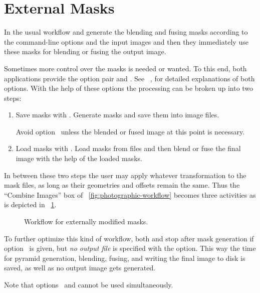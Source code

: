 

\section[External Masks]{\label{sec:external-masks}%
  External Masks}

In the usual workflow  and  generate the blending and
fusing masks according to the command-line options and the input images and then they
immediately use these masks for blending or fusing the output image.

Sometimes more control over the masks is needed or wanted.  To this end, both applications
provide the option pair  and .  See
\chapterName~, for detailed explanations of both options.  With the help
of these options the processing can be broken up into two steps:

\begin{enumerate}
\item
  Save masks with .  Generate masks and save them into image files.

  Avoid option~ unless the blended or fused image at this point is necessary.

\item
  Load masks with .  Load masks from files and then blend or fuse the final
  image with the help of the loaded masks.
\end{enumerate}

In between these two steps the user may apply whatever transformation to the mask files, as long
as their geometries and offsets remain the same.  Thus the ``Combine Images'' box of
\figureName~\ref{fig:photographic-workflow} becomes three activities as is depicted in
\figureName~\ref{fig:external-mask-workflow}.

\begin{figure}
  \begin{maxipage}
    \centering
  \end{maxipage}

  \caption[External mask workflow]{\label{fig:external-mask-workflow}%
    Workflow for externally modified masks.}
\end{figure}

To further optimize this kind of workflow, both  and 
stop after mask generation if option~ is given, but \emph{no output file}
is specified with the  option.  This way the time for pyramid generation,
blending, fusing, and writing the final image to disk is saved, as well as no output image gets
generated.

Note that options~ and  cannot be used simultaneously.



